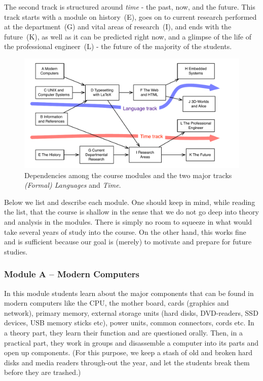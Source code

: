 \documentclass[conference]{IEEEtran}
\begin{document}
The second track is structured around \emph{time} - the past, now, and the future. This track starts with a module on history~(E), goes on to current research performed at the department~(G) and  vital areas of research~(I), and ends with the future~(K), as well as it can be predicted right now, and a glimpse of the life of the professional engineer~(L) - the future of the majority of the students. 

\begin{figure}[!t]
  \centering
  \includegraphics[width=\columnwidth]{moment-med-pilar}
  \caption{Dependencies among the course modules and the two major tracks \emph{(Formal) Languages} and \emph{Time}. }
  \label{fig:moment-med-pilar}
\end{figure}

Below we list and describe each module. One should keep in mind, while reading the list, that the course is shallow in the sense that we do not go deep into theory and analysis in the modules. There is simply no room to squeeze in what would take several years of study into the course. On the other hand, this works fine and is sufficient because our goal is (merely) to  motivate and prepare for future studies.

\subsubsection{Module A -- Modern Computers} In this module students learn about the major components that can be found in modern computers like the CPU, the mother board, cards (graphics and network), primary memory, external storage units (hard disks, DVD-readers, SSD devices, USB memory sticks etc), power units, common connectors, cords etc. In a theory part, they learn their function and are questioned orally. Then, in a practical part, they work in groups and disassemble a computer into its parts and open up components. (For this purpose, we keep a stash of old and broken hard disks and media readers through-out the year, and let the students break them before they are trashed.)
\end{document}
